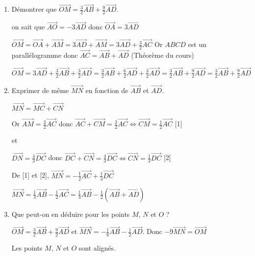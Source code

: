 \begin{enumerate}
\item  Démontrer que $\overrightarrow{OM}=\frac{3}{2}\overrightarrow{AB}+\frac{9}{2}\overrightarrow{AD}$.

on sait que $\overrightarrow{AO}=-3\overrightarrow{AD}$ donc $\overrightarrow{OA}= 3\overrightarrow{AD}$ 

$\overrightarrow{OM}= \overrightarrow{OA} + \overrightarrow{AM} = 3\overrightarrow{AD}+ \overrightarrow{AM}
= 3\overrightarrow{AD}+ \frac{3}{2}\overrightarrow{AC}$ Or $ABCD$ est un parallélogramme donc $\overrightarrow{AC} = \overrightarrow{AB} + \overrightarrow{AD}$ (Théorème du cours)


$\overrightarrow{OM} 
= 3\overrightarrow{AD}+ \frac{3}{2}\overrightarrow{AB}+ \frac{3}{2}\overrightarrow{AD} 
= \frac{3}{2}\overrightarrow{AB} + \frac{6}{2}\overrightarrow{AD}+ \frac{3}{2}\overrightarrow{AD} 
= \frac{3}{2}\overrightarrow{AB} + \frac{9}{2}\overrightarrow{AD}
= \frac{3}{2}\overrightarrow{AB}+\frac{9}{2}\overrightarrow{AD}$



\item  Exprimer de même $\overrightarrow{MN}$ en fonction de $\overrightarrow{AB}$ et $\overrightarrow{AD}$.

$\overrightarrow{MN} = \overrightarrow{MC} + \overrightarrow{CN} $

Or $\overrightarrow{AM}=\frac{3}{2}\overrightarrow{AC}$ donc $\overrightarrow{AC} + \overrightarrow{CM}=\frac{3}{2}\overrightarrow{AC}\Longleftrightarrow \overrightarrow{CM}=\frac{1}{2}\overrightarrow{AC}$  [1]

et 

$\overrightarrow{DN}=\frac{4}{3}\overrightarrow{DC}$ donc $\overrightarrow{DC} + \overrightarrow{CN}=\frac{4}{3}\overrightarrow{DC}\Longleftrightarrow \overrightarrow{CN}=\frac{1}{3}\overrightarrow{DC}$  [2]


De [1] et [2], $\overrightarrow{MN} = -\frac{1}{2}\overrightarrow{AC} + \frac{1}{3}\overrightarrow{DC} $

$\overrightarrow{MN} = \frac{1}{3}\overrightarrow{AB} -\frac{1}{2}\overrightarrow{AC} = \frac{1}{3}\overrightarrow{AB} -\frac{1}{2}\left( \overrightarrow{AB} + \overrightarrow{AD}\right)$
 
 
\item  Que peut-on en déduire pour les points $M$, $N$ et $O$ ?

$\overrightarrow{OM}= \frac{3}{2}\overrightarrow{AB}+\frac{9}{2}\overrightarrow{AD}$
et 
$\overrightarrow{MN} = -\frac{1}{6}\overrightarrow{AB} -\frac{1}{2}\overrightarrow{AD}$.
Donc $-9\overrightarrow{MN} = \overrightarrow{OM} $

Les points $M$, $N$ et $O$ sont alignés.
\end{enumerate}